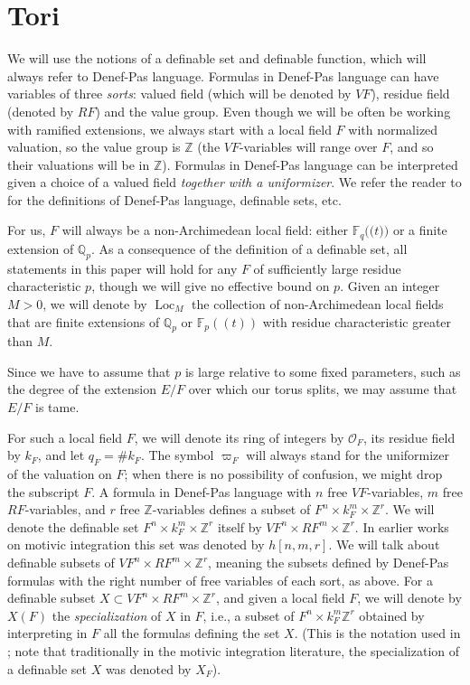 \documentclass{amsart}
\newcommand{\Q}{{\mathbb Q}}
\newcommand{\F}{{\mathbb F}}
\newcommand{\Z}{{\mathbb Z}}
\newcommand{\ri}{\mathcal{O}}
\newcommand{\loc}{\operatorname{Loc}}
\def\llp{\mathopen{(\!(}}
\def\rrp{\mathopen{)\!)}}
\theoremstyle{plain}
\theoremstyle{definition}
\begin{document}
\section{Tori} 
We will use the notions of a definable set and definable function, which will always refer to Denef-Pas language. 
Formulas in Denef-Pas language can have variables of three \emph{sorts}: valued field (which will be denoted by $VF$), residue field (denoted by $RF$) and the value group. Even though we will be often be working with ramified extensions, we always start with a local field $F$ with normalized valuation, so the value group is $\Z$ (the $VF$-variables will range over $F$, and so their valuations will be in $\Z$).
Formulas in Denef-Pas language can be interpreted given a choice of a valued field \emph{together with a uniformizer}. 
We refer the reader to \cite{what's the best ref?} for the definitions of Denef-Pas language, definable sets, etc. 

For us, $F$ will always be a non-Archimedean local field: either $\F_q\llp t\rrp$ or a finite extension of $\Q_p$.
As a consequence of the definition of a definable set, all statements in this paper will hold for any $F$ of sufficiently large residue characteristic $p$, 
though we will give no effective bound on $p$. 
Given an integer $M>0$, we will denote by $\loc_M$ the collection of non-Archimedean local fields that are finite extensions of $\Q_p$ or $\F_p((t))$ with residue characteristic greater than $M$. 

Since we have to assume that $p$ is large relative to some fixed parameters, such as the degree of the extension $E/F$ over which our torus splits, we may assume that $E/F$ is tame.  

For such a local field $F$, we will denote its ring of integers by $\ri_F$, its residue field by $k_F$, and let $q_F=\# k_F$. The symbol $\varpi_F$ will always stand for the uniformizer of the valuation on $F$; when there is no possibility of confusion, we might drop the subscript $F$. 
A formula in Denef-Pas language  with $n$ free $VF$-variables, $m$ free $RF$-variables, and $r$ free 
$\Z$-variables 
defines a subset of $F^n\times k_F^m \times \Z^r$. 
We will denote the definable set $F^n\times k_F^m \times \Z^r$ itself by $VF^n\times RF^m\times \Z^r$. In earlier works on motivic integration this set was denoted by $h[n,m,r]$. 
We will talk about definable subsets of $VF^n\times RF^m\times \Z^r$, meaning the subsets defined by Denef-Pas formulas with the right number of free variables of each sort, as above. 
For  a definable subset $X\subset VF^n\times RF^m\times \Z^r$, and given a local field $F$,  
we will denote by $X(F)$ the \emph{specialization} of $X$ in $F$, i.e., a subset of $F^n\times k_F^m\Z^r$ obtained by interpreting in $F$ all the formulas defining the set $X$. 
(This is the notation used in \cite{hales:transfert}; note that traditionally in the motivic integration literature, the {specialization} of a definable set $X$ was denoted by $X_F$). 
\end{document}
